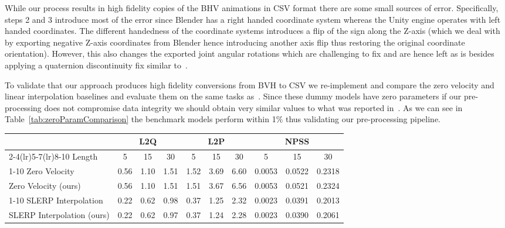 \documentclass[letterpaper]{article} \usepackage[]{aaai23}  \usepackage{times}  \usepackage{helvet}  \usepackage{courier}  \usepackage[hyphens]{url}  \usepackage{graphicx} \urlstyle{rm} \def\UrlFont{\rm}  \usepackage{natbib}  \usepackage{caption} \frenchspacing  \setlength{\pdfpagewidth}{8.5in} \setlength{\pdfpageheight}{11in}
\begin{document}
While our process results in high fidelity copies of the BHV animations in CSV format there are some small sources of error.
Specifically, steps 2 and 3 introduce most of the error since Blender has a right handed coordinate system whereas the Unity engine operates with left handed coordinates. The different handedness of the coordinate systems introduces a flip of the sign along the Z-axis (which we deal with by exporting negative Z-axis coordinates from Blender hence introducing another axis flip thus restoring the original coordinate orientation). However, this also changes the exported joint angular rotations which are challenging to fix and are hence left as is besides applying a quaternion discontinuity fix similar to~\cite{harvey2020robust}.

To validate that our approach produces high fidelity conversions from BVH to CSV we re-implement and compare the zero velocity and linear interpolation baselines and evaluate them on the same tasks as~\cite{harvey2020robust}. 
Since these dummy models have zero parameters if our pre-processing does not compromise data integrity we should obtain very similar values to what was reported in~\cite{harvey2020robust}.
As we can see in Table~\ref{tab:zeroParamComparison} the benchmark models perform within  1\% thus validating our pre-processing pipeline.

\begin{table*}[!ht]
\centering
\caption{Comparison of zero parameter models to verify data integrity of LaFAN1 benchmark.}
\begin{tabularx}{\textwidth}{l@{\extracolsep{\fill}} ccccccccc}
&\multicolumn{3}{c}{\textbf{L2Q}} &\multicolumn{3}{c}{\textbf{L2P}} &\multicolumn{3}{c}{\textbf{NPSS}} \\
\cmidrule(lr){2-4}\cmidrule(lr){5-7}\cmidrule(lr){8-10}
Length & 5 & 15 & 30 & 5 & 15 & 30 & 5 & 15 & 30\\
\cmidrule(lr){1-10}
Zero Velocity~\cite{harvey2020robust} & 0.56 & 1.10 & 1.51 & 1.52 & 3.69 & 6.60 & 0.0053 & 0.0522 & 0.2318 \\
Zero Velocity (ours) & 0.56 & 1.10 & 1.51 & 1.51 & 3.67 & 6.56 & 0.0053 & 0.0521 & 0.2324 \\
\cmidrule(lr){1-10}
SLERP Interpolation~\cite{harvey2020robust} & 0.22 & 0.62 & 0.98 & 0.37 & 1.25 & 2.32 & 0.0023 & 0.0391 & 0.2013 \\
SLERP Interpolation (ours) & 0.22 & 0.62 & 0.97 & 0.37 & 1.24 & 2.28 & 0.0023 & 0.0390 & 0.2061 \\
\end{tabularx}\label{tab:zeroParamComparison}
\end{table*}
\end{document}
